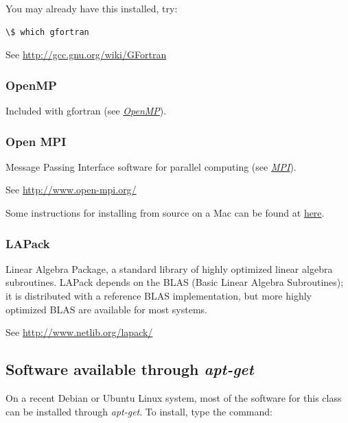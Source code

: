 \documentclass[letterpaper,10pt,english]{sphinxmanual}
\begin{document}
You may already have this installed, try:

\begin{Verbatim}[commandchars=\\\{\}]
\$ which gfortran
\end{Verbatim}

See \href{http://gcc.gnu.org/wiki/GFortran}{http://gcc.gnu.org/wiki/GFortran}


\subsubsection{OpenMP}
\label{software_installation:openmp}\label{software_installation:installing-openmp}
Included with gfortran (see {\hyperref[openmp:openmp]{\emph{OpenMP}}}).


\subsubsection{Open MPI}
\label{software_installation:installing-mpi}\label{software_installation:open-mpi}
Message Passing Interface software for parallel computing (see {\hyperref[mpi:mpi]{\emph{MPI}}}).

See \href{http://www.open-mpi.org/}{http://www.open-mpi.org/}

Some instructions for installing from source on a Mac can be found at
\href{https://sites.google.com/site/dwhipp/tutorials/installing-open-mpi-on-mac-os-x}{here}.


\subsubsection{LAPack}
\label{software_installation:lapack}\label{software_installation:installing-lapack}
Linear Algebra Package, a standard library of highly optimized linear
algebra subroutines.  LAPack depends on the BLAS (Basic Linear Algebra
Subroutines); it is distributed with a reference BLAS implementation,
but more highly optimized BLAS are available for most systems.

See \href{http://www.netlib.org/lapack/}{http://www.netlib.org/lapack/}


\subsection{Software available through \emph{apt-get}}
\label{software_installation:apt-get}\label{software_installation:software-available-through-apt-get}
On a recent Debian or Ubuntu Linux system, most of the software for
this class can be installed through \emph{apt-get}.  To install, type the
command:
\end{document}
